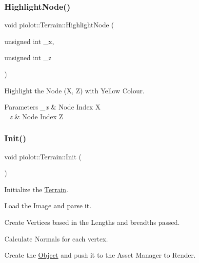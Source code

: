 \subsubsection{\texorpdfstring{Highlight\+Node()}{HighlightNode()}}
{\footnotesize\ttfamily void piolot\+::\+Terrain\+::\+Highlight\+Node (\begin{DoxyParamCaption}\item[{unsigned int}]{\+\_\+x,  }\item[{unsigned int}]{\+\_\+z }\end{DoxyParamCaption})}



Highlight the Node (X, Z) with Yellow Colour. 


\begin{DoxyParams}{Parameters}
{\em \+\_\+x} & Node Index X \\
\hline
{\em \+\_\+z} & Node Index Z \\
\hline
\end{DoxyParams}
\mbox{\label{classpiolot_1_1_terrain_af737ba0aa165e923a3e6bd37f6c9a9ab}} 
\subsubsection{\texorpdfstring{Init()}{Init()}}
{\footnotesize\ttfamily void piolot\+::\+Terrain\+::\+Init (\begin{DoxyParamCaption}{ }\end{DoxyParamCaption})}



Initialize the \mbox{\hyperlink{classpiolot_1_1_terrain}{Terrain}}. 


\begin{DoxyEnumerate}
\item Load the Image and parse it.
\item Create Vertices based in the Lengths and breadths passed.
\item Calculate Normals for each vertex.
\item Create the \mbox{\hyperlink{classpiolot_1_1_object}{Object}} and push it to the Asset Manager to Render. 
\end{DoxyEnumerate}\mbox{\label{classpiolot_1_1_terrain_a8c86b33ae5763a67ad783bebb37d88c5}} 
